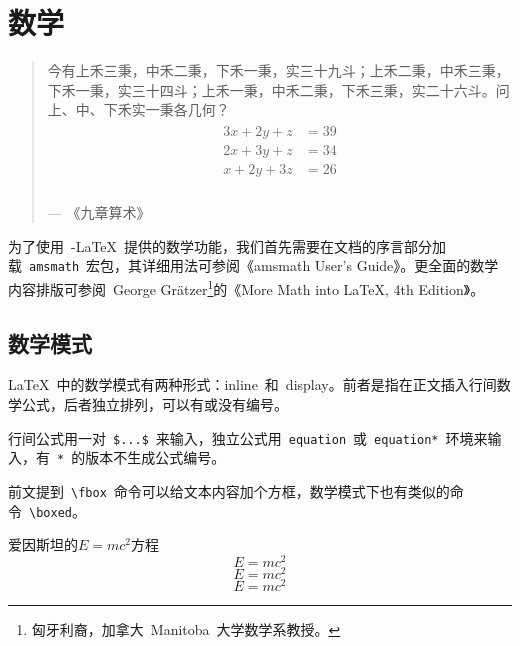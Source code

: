 \chapter{数学}

\begin{quotation}
今有上禾三秉，中禾二秉，下禾一秉，实三十九斗；上禾二秉，中禾三秉，下禾一秉，实三十四斗；上禾一秉，中禾二秉，下禾三秉，实二十六斗。问上、中、下禾实一秉各几何？
\begin{gather*}
\begin{split}
    3x+2y+z &= 39 \\
    2x+3y+z &= 34 \\
    x+2y+3z &= 26 \\
\end{split}
\end{gather*}
\begin{flushright}
--- 《九章算术》
\end{flushright}
\end{quotation}


为了使用~\AmS-\LaTeX~提供的数学功能，我们首先需要在文档的序言部分加载~\verb|amsmath|~宏包，其详细用法可参阅《amsmath User's Guide》\citep{AMS_2002}。更全面的数学内容排版可参阅~George Grätzer\footnote{匈牙利裔，加拿大~Manitoba~大学数学系教授。}的《More Math into \LaTeX, 4th Edition》\citep{Gratzer_2007}。

\section{数学模式}
\LaTeX~中的数学模式有两种形式：inline~和~display。前者是指在正文插入行间数学公式，后者独立排列，可以有或没有编号。

行间公式用一对~\verb|$...$|~来输入，独立公式用~\verb|equation|~或~\verb|equation*|~环境来输入，有~\verb|*|~的版本不生成公式编号。

前文提到~\verb|\fbox|~命令可以给文本内容加个方框，数学模式下也有类似的命令~\verb|\boxed|。

\begin{demo}
爱因斯坦的$E=mc^2$方程
\begin{equation} 
    E=mc^2 
\end{equation}
\[ E=mc^2 \]
\[ \boxed{E=mc^2} \]
\end{demo}


